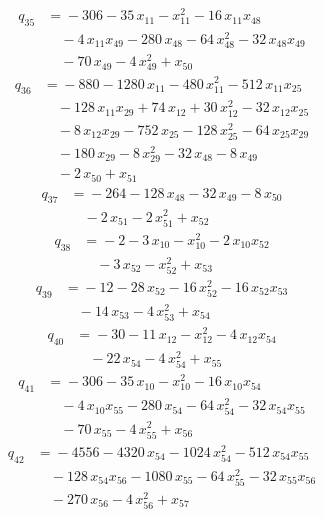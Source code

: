 \documentclass[11pt]{article}
\theoremstyle{remark}\newtheorem{remark}[theorem]{Remark}
\begin{document}
\begin{align*}
q_{35} &={}-306 -35\,x_{11} -x_{11}^{2} -16\,x_{11}x_{48}\\
&\quad -4\,x_{11}x_{49} -280\,x_{48} -64\,x_{48}^{2} -32\,x_{48}x_{49}\\
&\quad -70\,x_{49} -4\,x_{49}^{2} +x_{50}
\end{align*}
\begin{align*}
q_{36} &={}-880 -1280\,x_{11} -480\,x_{11}^{2} -512\,x_{11}x_{25}\\
&\quad -128\,x_{11}x_{29} +74\,x_{12} +30\,x_{12}^{2} -32\,x_{12}x_{25}\\
&\quad -8\,x_{12}x_{29} -752\,x_{25} -128\,x_{25}^{2} -64\,x_{25}x_{29}\\
&\quad -180\,x_{29} -8\,x_{29}^{2} -32\,x_{48} -8\,x_{49}\\
&\quad -2\,x_{50} +x_{51}
\end{align*}
\begin{align*}
q_{37} &={}-264 -128\,x_{48} -32\,x_{49} -8\,x_{50}\\
&\quad -2\,x_{51} -2\,x_{51}^{2} +x_{52}
\end{align*}
\begin{align*}
q_{38} &={}-2 -3\,x_{10} -x_{10}^{2} -2\,x_{10}x_{52}\\
&\quad -3\,x_{52} -x_{52}^{2} +x_{53}
\end{align*}
\begin{align*}
q_{39} &={}-12 -28\,x_{52} -16\,x_{52}^{2} -16\,x_{52}x_{53}\\
&\quad -14\,x_{53} -4\,x_{53}^{2} +x_{54}
\end{align*}
\begin{align*}
q_{40} &={}-30 -11\,x_{12} -x_{12}^{2} -4\,x_{12}x_{54}\\
&\quad -22\,x_{54} -4\,x_{54}^{2} +x_{55}
\end{align*}
\begin{align*}
q_{41} &={}-306 -35\,x_{10} -x_{10}^{2} -16\,x_{10}x_{54}\\
&\quad -4\,x_{10}x_{55} -280\,x_{54} -64\,x_{54}^{2} -32\,x_{54}x_{55}\\
&\quad -70\,x_{55} -4\,x_{55}^{2} +x_{56}
\end{align*}
\begin{align*}
q_{42} &={}-4556 -4320\,x_{54} -1024\,x_{54}^{2} -512\,x_{54}x_{55}\\
&\quad -128\,x_{54}x_{56} -1080\,x_{55} -64\,x_{55}^{2} -32\,x_{55}x_{56}\\
&\quad -270\,x_{56} -4\,x_{56}^{2} +x_{57}
\end{align*}
\end{document}
